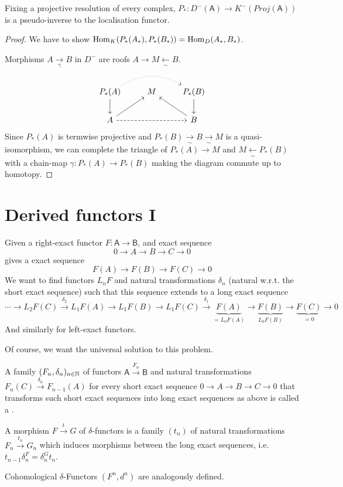 \documentclass[fontsize=11pt,fleqn,a4paper]{scrartcl}
\begin{document}
\begin{corollary}
Fixing a projective resolution of every complex, $P_\ast: D^-(\mathsf{A}) \to K^-(Proj(\mathsf{A}))$ is a pseudo-inverse to the localisation functor.
\end{corollary}
\begin{proof}
We have to show $\operatorname{Hom}_{K}(P_\ast(A_\ast) , P_\ast(B_\ast)) = \operatorname{Hom}_D(A_\ast,B_\ast)$.

Morphisms $A\xrightarrow[\gamma]{} B$ in $D^-$ are roofs $A \to M \xleftarrow[\sim]{} B$.
\[\begin{tikzcd}
P_\ast(A) \ar[rr,dotted,bend left] \ar[d] & M & P_\ast(B) \ar[d] \\
A \ar[rr,dashed] \ar[ru] && B \ar[lu]
\end{tikzcd}\]
Since $P_\ast(A)$ is termwise projective and $P_\ast(B) \xrightarrow[\sim]{}B \xrightarrow[\sim]{} M$ is a quasi-isomorphism, we can complete the triangle of $P_\ast(A) \to M$ and $M\xleftarrow[\sim]{} P_\ast(B)$ with a chain-map $\gamma: P_\ast(A) \to P_\ast(B)$ making the diagram commute up to homotopy.
\end{proof}

\section{Derived functors I}

\begin{remark}
Given a right-exact functor $F: \mathsf{A} \to \mathsf{B}$, and exact sequence
\[0\to A \to B \to C \to 0\]
gives a exact sequence
\[F(A) \to F(B) \to F(C) \to 0\]
We want to find functors $L_nF$ and natural transformations $\delta_n$ (natural w.r.t. the short exact sequence) such that this sequence extends to a long exact sequence
\[\cdots \to L_2F(C) \xrightarrow{\delta_2} L_1F(A) \to L_1F(B) \to L_1F(C) \xrightarrow{\delta_1} \underbrace{F(A)}_{=L_0F(A)} \to \underbrace{F(B)}_{L_0F(B)} \to \underbrace{F(C)}_{=0} \to 0\]
And similarly for left-exact functors.

Of course, we want the universal solution to this problem.
\end{remark}

\begin{definition}
A family $(F_n,\delta_n)_{n\in\mathbb{N}}$ of functors $\mathsf{A} \xrightarrow{F_n} \mathsf{B}$ and natural transformations $F_n(C) \xrightarrow{\delta_n} F_{n-1}(A)$ for every short exact sequence $0\to A\to B\to C\to 0$ that transforms such short exact sequences into long exact sequences as above is called a .

A morphism $F\xrightarrow{t}G$ of $\delta$-functors is a family $(t_n)$ of natural transformations $F_n \xrightarrow{t_n} G_n$ which induces morphisms between the long exact sequences, i.e. $t_{n-1}\delta_n^F = \delta_n^G t_n$.

Cohomological $\delta$-Functors $(F^n,d^n)$ are analogously defined.
\end{definition}
\end{document}
